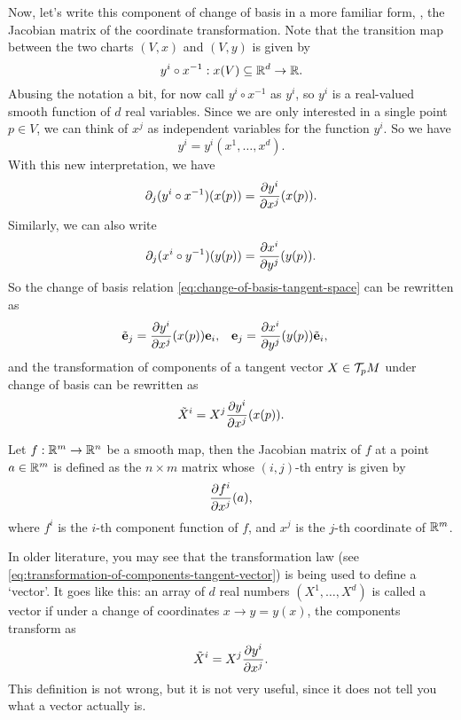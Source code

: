 Now, let's write this component of change of basis in a more familiar form, \ie, the Jacobian matrix of the coordinate transformation. Note that the transition map between the two charts \((V, x)\) and \((V, y)\) is given by
\begin{equation}
    y^i \circ x^{-1}: x(V) \subseteq \mathbb R^d \to \mathbb R.
\end{equation}
Abusing the notation a bit, for now call \(y^i \circ x^{-1}\) as \(y^i\), so \(y^i\) is a real-valued smooth function of \(d\) real variables. Since we are only interested in a single point \(p \in V\), we can think of \(x^j\) as independent variables for the function \(y^i\). So we have
\begin{equation}
    y^i = y^i(x^1, \ldots, x^d).
\end{equation}
With this new interpretation, we have
\begin{equation}
    \partial_j (y^i \circ x^{-1})(x(p)) = \pdv{y^i}{x^j} \qty(x(p)).
\end{equation}
Similarly, we can also write
\begin{equation}
    \partial_j (x^i \circ y^{-1})(y(p)) = \pdv{x^i}{y^j} \qty(y(p)).
\end{equation}
So the change of basis relation \eqref{eq:change-of-basis-tangent-space} can be rewritten as
\begin{align}
    \tilde{\vb{e}}_j & = \pdv{y^i}{x^j} \qty(x(p)) \vb{e}_i, & \vb{e}_j & = \pdv{x^i}{y^j} \qty(y(p)) \tilde{\vb{e}}_i,
\end{align}
and the transformation of components of a tangent vector \(X \in \mathcal T_p M\) under change of basis can be rewritten as
\begin{equation} \label{eq:transformation-of-components-tangent-vector}
    \tilde{X}^i = X^j \pdv{y^i}{x^j} \qty(x(p)).
\end{equation}
\begin{remark}
    Let \(f: \mathbb R^m \to \mathbb R^n\) be a smooth map, then the Jacobian matrix of \(f\) at a point \(a \in \mathbb R^m\) is defined as the \(n \times m\) matrix whose \((i, j)\)-th entry is given by
    \begin{equation}
        \pdv{f^i}{x^j} \qty(a),
    \end{equation}
    where \(f^i\) is the \(i\)-th component function of \(f\), and \(x^j\) is the \(j\)-th coordinate of \(\mathbb R^m\).
\end{remark}

In older literature, you may see that the transformation law (see \eqref{eq:transformation-of-components-tangent-vector}) is being used to define a `vector'. It goes like this: an array of \(d\) real numbers \((X^1, \ldots, X^d)\) is called a vector if under a change of coordinates \(x \to y = y(x)\), the components transform as
\begin{equation}
    \tilde{X}^i = X^j \pdv{y^i}{x^j}.
\end{equation}
This definition is not wrong, but it is not very useful, since it does not tell you what a vector actually is.

